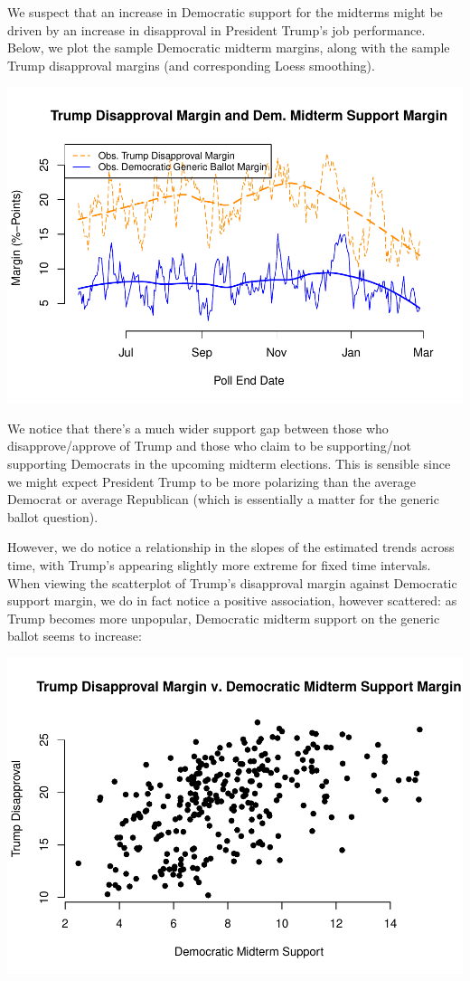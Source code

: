 \documentclass[]{article}
\begin{document}
We suspect that an increase in Democratic support for the midterms might
be driven by an increase in disapproval in President Trump's job
performance. Below, we plot the sample Democratic midterm margins, along
with the sample Trump disapproval margins (and corresponding Loess
smoothing).

\begin{center}\includegraphics{midterm_project_final_files/figure-latex/trump_v_dem_support-1} \end{center}

We notice that there's a much wider support gap between those who
disapprove/approve of Trump and those who claim to be supporting/not
supporting Democrats in the upcoming midterm elections. This is sensible
since we might expect President Trump to be more polarizing than the
average Democrat or average Republican (which is essentially a matter
for the generic ballot question).

However, we do notice a relationship in the slopes of the estimated
trends across time, with Trump's appearing slightly more extreme for
fixed time intervals. When viewing the scatterplot of Trump's
disapproval margin against Democratic support margin, we do in fact
notice a positive association, however scattered: as Trump becomes more
unpopular, Democratic midterm support on the generic ballot seems to
increase:

\begin{center}\includegraphics{midterm_project_final_files/figure-latex/scatter-1} \end{center}
\end{document}
